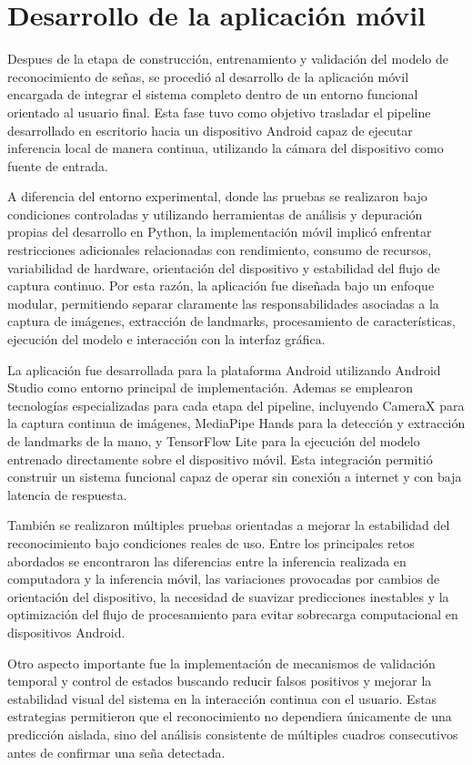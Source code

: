 	\section{Desarrollo de la aplicación móvil}
	Despues de la etapa de construcción, entrenamiento y validación del modelo de reconocimiento de señas, se procedió al desarrollo de la aplicación móvil encargada de integrar el sistema completo dentro de un entorno funcional orientado al usuario final. Esta fase tuvo como objetivo trasladar el pipeline desarrollado en escritorio hacia un dispositivo Android capaz de ejecutar inferencia local de manera continua, utilizando la cámara del dispositivo como fuente de entrada.
	
	A diferencia del entorno experimental, donde las pruebas se realizaron bajo condiciones controladas y utilizando herramientas de análisis y depuración propias del desarrollo en Python, la implementación móvil implicó enfrentar restricciones adicionales relacionadas con rendimiento, consumo de recursos, variabilidad de hardware, orientación del dispositivo y estabilidad del flujo de captura continuo. Por esta razón, la aplicación fue diseñada bajo un enfoque modular, permitiendo separar claramente las responsabilidades asociadas a la captura de imágenes, extracción de landmarks, procesamiento de características, ejecución del modelo e interacción con la interfaz gráfica.
	
	La aplicación fue desarrollada para la plataforma Android utilizando Android Studio como entorno principal de implementación. Ademas se emplearon tecnologías especializadas para cada etapa del pipeline, incluyendo CameraX para la captura continua de imágenes, MediaPipe Hands para la detección y extracción de landmarks de la mano, y TensorFlow Lite para la ejecución del modelo entrenado directamente sobre el dispositivo móvil. Esta integración permitió construir un sistema  funcional capaz de operar sin conexión a internet y con baja latencia de respuesta.
	
	También se realizaron múltiples pruebas orientadas a mejorar la estabilidad del reconocimiento bajo condiciones reales de uso. Entre los principales retos abordados se encontraron las diferencias entre la inferencia realizada en computadora y la inferencia móvil, las variaciones provocadas por cambios de orientación del dispositivo, la necesidad de suavizar predicciones inestables y la optimización del flujo de procesamiento para evitar sobrecarga computacional en dispositivos Android.
	
	Otro aspecto importante fue la implementación de mecanismos de validación temporal y control de estados buscando reducir falsos positivos y mejorar la estabilidad visual del sistema en la interacción continua con el usuario. Estas estrategias permitieron que el reconocimiento no dependiera únicamente de una predicción aislada, sino del análisis consistente de múltiples cuadros consecutivos antes de confirmar una seña detectada.
	
